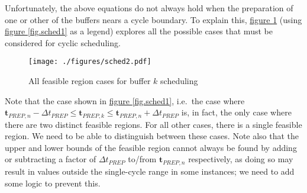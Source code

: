 Unfortunately, the above equations do not always hold when the preparation of
one or other of the buffers nears a cycle boundary.
To explain this, \hyperref[fig.sched2]{figure \ref*{fig.sched2}} (using
\hyperref[fig.sched1]{figure \ref*{fig.sched1}} as a legend) explores all the
possible cases that must be considered for cyclic scheduling.
\begin{figure}
    \centering
    \texttt{[image: ./figures/sched2.pdf]}
    \caption{All feasible region cases for buffer $k$ scheduling}
    \label{fig.sched2}
\end{figure}
Note that the case shown in \hyperref[fig.sched1]{figure \ref*{fig.sched1}}, 
i.e.\ the case where
$\boldsymbol{t}_{\mathit{PREP},n} - \Delta t_{\mathit{PREP}} \le 
 \boldsymbol{t}_{\mathit{PREP},k} \le
 \boldsymbol{t}_{\mathit{PREP},n} + \Delta t_{\mathit{PREP}}$
is, in fact, the only case where there are two distinct feasible regions.
For all other cases, there is a single feasible region.  We need to be able to
distinguish between these cases.
Note also that the upper and lower bounds of the feasible region cannot always
be found by adding or subtracting a factor of $\Delta t_{\mathit{PREP}}$
to/from $\boldsymbol{t}_{\mathit{PREP},n}$ respectively, as doing so may result
in values outside the single-cycle range in some instances; we need to add some
logic to prevent this.

